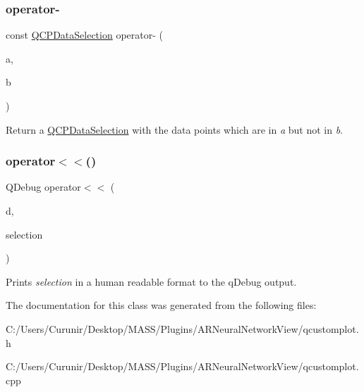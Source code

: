\subsubsection{\texorpdfstring{operator-\/}{operator-}\hspace{0.1cm}{\footnotesize\ttfamily [8/8]}}
{\footnotesize\ttfamily const \hyperlink{class_q_c_p_data_selection}{Q\+C\+P\+Data\+Selection} operator-\/ (\begin{DoxyParamCaption}\item[{const \hyperlink{class_q_c_p_data_range}{Q\+C\+P\+Data\+Range} \&}]{a,  }\item[{const \hyperlink{class_q_c_p_data_range}{Q\+C\+P\+Data\+Range} \&}]{b }\end{DoxyParamCaption})\hspace{0.3cm}{\ttfamily [friend]}}

Return a \hyperlink{class_q_c_p_data_selection}{Q\+C\+P\+Data\+Selection} with the data points which are in {\itshape a} but not in {\itshape b}. \mbox{\label{class_q_c_p_data_selection_aed65b8988afe6b03adeadf5edf663670}} 
\subsubsection{\texorpdfstring{operator$<$$<$()}{operator<<()}}
{\footnotesize\ttfamily Q\+Debug operator$<$$<$ (\begin{DoxyParamCaption}\item[{Q\+Debug}]{d,  }\item[{const \hyperlink{class_q_c_p_data_selection}{Q\+C\+P\+Data\+Selection} \&}]{selection }\end{DoxyParamCaption})\hspace{0.3cm}{\ttfamily [related]}}

Prints {\itshape selection} in a human readable format to the q\+Debug output. 

The documentation for this class was generated from the following files\+:\begin{DoxyCompactItemize}
\item 
C\+:/\+Users/\+Curunir/\+Desktop/\+M\+A\+S\+S/\+Plugins/\+A\+R\+Neural\+Network\+View/qcustomplot.\+h\item 
C\+:/\+Users/\+Curunir/\+Desktop/\+M\+A\+S\+S/\+Plugins/\+A\+R\+Neural\+Network\+View/qcustomplot.\+cpp\end{DoxyCompactItemize}
